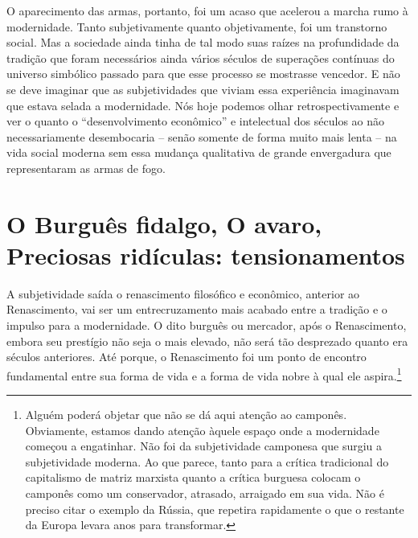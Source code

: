 O aparecimento das armas, portanto, foi um acaso que acelerou a marcha
rumo à modernidade. Tanto subjetivamente quanto objetivamente, foi um
transtorno social. Mas a sociedade ainda tinha de tal modo suas raízes
na profundidade da tradição que foram necessários ainda vários séculos
de superações contínuas do universo simbólico passado para que esse
processo se mostrasse vencedor. E não se deve imaginar que as
subjetividades que viviam essa experiência imaginavam que estava selada
a modernidade. Nós hoje podemos olhar retrospectivamente e ver o quanto
o ``desenvolvimento econômico'' e intelectual dos séculos  ao  não
necessariamente desembocaria -- senão somente de forma muito mais lenta
-- na vida social moderna sem essa mudança qualitativa de grande
envergadura que representaram as armas de fogo.

\section{O Burguês fidalgo, O avaro, Preciosas ridículas: tensionamentos}

A subjetividade saída o renascimento filosófico e econômico, anterior ao
Renascimento, vai ser um entrecruzamento mais acabado entre a tradição e
o impulso para a modernidade. O dito burguês ou mercador, após o
Renascimento, embora seu prestígio não seja o mais elevado, não será tão
desprezado quanto era séculos anteriores. Até porque, o Renascimento foi
um ponto de encontro fundamental entre sua forma de vida e a forma de
vida nobre à qual ele aspira.\footnote{Alguém poderá objetar que não se
  dá aqui atenção ao camponês. Obviamente, estamos dando atenção àquele
  espaço onde a modernidade começou a engatinhar. Não foi da
  subjetividade camponesa que surgiu a subjetividade moderna. Ao que
  parece, tanto para a crítica tradicional do capitalismo de matriz
  marxista quanto a crítica burguesa colocam o camponês como um
  conservador, atrasado, arraigado em sua vida. Não é preciso citar o
  exemplo da Rússia, que repetira rapidamente o que o restante da Europa
  levara anos para transformar.}

